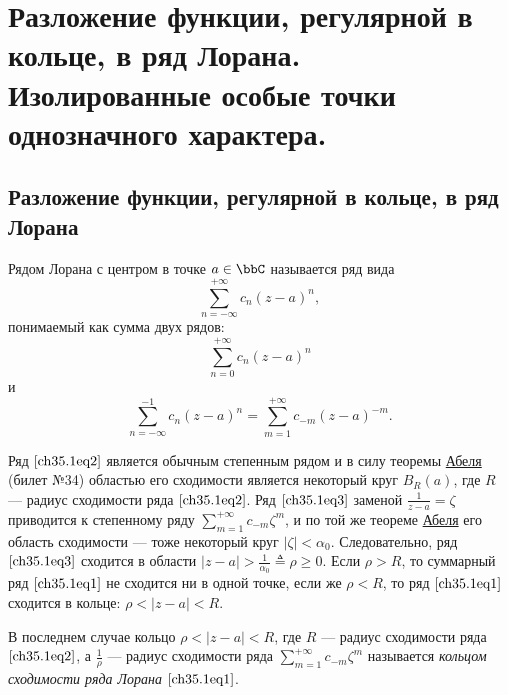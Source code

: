\chapter{Разложение функции, регулярной в кольце, в ряд Лорана. Изолированные особые точки однозначного характера.}

\section{Разложение функции, регулярной в кольце, в ряд Лорана}

\begin{leftbar}
\begin{defn}
Рядом Лорана с центром в точке $a \in \bbC$ называется ряд вида
\begin{equation} \label{ch35.1eq1}
\sum\limits_{n = -\infty}^{+\infty} c_n (z - a)^n,
\end{equation}
понимаемый как сумма двух рядов:
\begin{equation} \label{ch35.1eq2}
\sum\limits_{n = 0}^{+\infty} c_n (z - a)^n
\end{equation}
и
\begin{equation} \label{ch35.1eq3}
\sum\limits_{n = -\infty}^{-1} c_n (z - a)^n = \sum\limits_{m = 1}^{+\infty} c_{-m} (z - a)^{-m}.
\end{equation}
\end{defn}
\end{leftbar}

Ряд $\eqref{ch35.1eq2}$ является обычным степенным рядом и в силу теоремы \hyperref[ch34.2Thm1]{Абеля} (билет №34) областью его сходимости является некоторый круг $B_R(a)$, где $R$ --- радиус сходимости ряда $\eqref{ch35.1eq2}$. Ряд $\eqref{ch35.1eq3}$ заменой $\frac{1}{z - a} = \zeta$ приводится к степенному ряду $\sum\limits_{m = 1}^{+\infty}c_{-m} \zeta^m$, и по той же теореме \hyperref[ch34.2Thm1]{Абеля} его область сходимости --- тоже некоторый круг $|\zeta| < \alpha_0$. Следовательно, ряд $\eqref{ch35.1eq3}$ сходится в области $|z - a| > \frac{1}{\alpha_0} \triangleq \rho \ge 0$. Если $\rho > R$, то суммарный ряд $\eqref{ch35.1eq1}$ не сходится ни в одной точке, если же $\rho < R$, то ряд $\eqref{ch35.1eq1}$ сходится в кольце: $\rho < |z - a| < R$.

В последнем случае кольцо $\rho < |z - a| < R$, где $R$ --- радиус сходимости ряда $\eqref{ch35.1eq2}$, а $\frac{1}{\rho}$ --- радиус сходимости ряда $\sum\limits_{m = 1}^{+\infty} c_{-m} \zeta^m$ называется \textit{кольцом сходимости ряда Лорана} $\eqref{ch35.1eq1}$.

